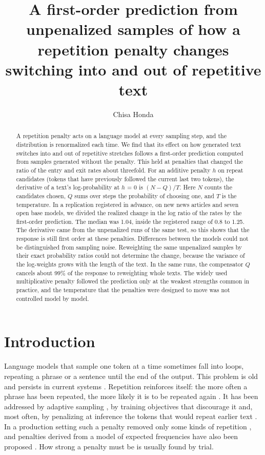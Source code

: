 \documentclass[aps,prx,onecolumn,superscriptaddress,longbibliography]{revtex4-2}
\begin{document}
\title{A first-order prediction from unpenalized samples of how a repetition penalty changes switching into and out of repetitive text}
\author{Chisa Honda}
\begin{abstract}
A repetition penalty acts on a language model at every sampling step, and the distribution is renormalized each time. We find that its effect on how generated text switches into and out of repetitive stretches follows a first-order prediction computed from samples generated without the penalty. This held at penalties that changed the ratio of the entry and exit rates about threefold. For an additive penalty \(h\) on repeat candidates (tokens that have previously followed the current last two tokens), the derivative of a text's log-probability at \(h\) = 0 is \((N-Q)/T\). Here \(N\) counts the candidates chosen, \(Q\) sums over steps the probability of choosing one, and \(T\) is the temperature. In a replication registered in advance, on new news articles and seven open base models, we divided the realized change in the log ratio of the rates by the first-order prediction. The median was 1.04, inside the registered range of 0.8 to 1.25. The derivative came from the unpenalized runs of the same test, so this shows that the response is still first order at these penalties. Differences between the models could not be distinguished from sampling noise. Reweighting the same unpenalized samples by their exact probability ratios could not determine the change, because the variance of the log-weights grows with the length of the text. In the same runs, the compensator \(Q\) cancels about 99\% of the response to reweighting whole texts. The widely used multiplicative penalty followed the prediction only at the weakest strengths common in practice, and the temperature that the penalties were designed to move was not controlled model by model.
\end{abstract}
\maketitle

\section{Introduction}

Language models that sample one token at a time sometimes fall into loops, repeating a phrase or a sentence until the end of the output. This problem is old and persists in current systems \cite{1904.09751,2012.14660,2206.02369,2310.10226,2512.12895}. Repetition reinforces itself: the more often a phrase has been repeated, the more likely it is to be repeated again \cite{2206.02369}. It has been addressed by adaptive sampling \cite{2007.14966}, by training objectives that discourage it \cite{1908.04319} and, most often, by penalizing at inference the tokens that would repeat earlier text \cite{1909.05858}. In a production setting such a penalty removed only some kinds of repetition \cite{2512.04419}, and penalties derived from a model of expected frequencies have also been proposed \cite{2607.22694}. How strong a penalty must be is usually found by trial.
\end{document}
